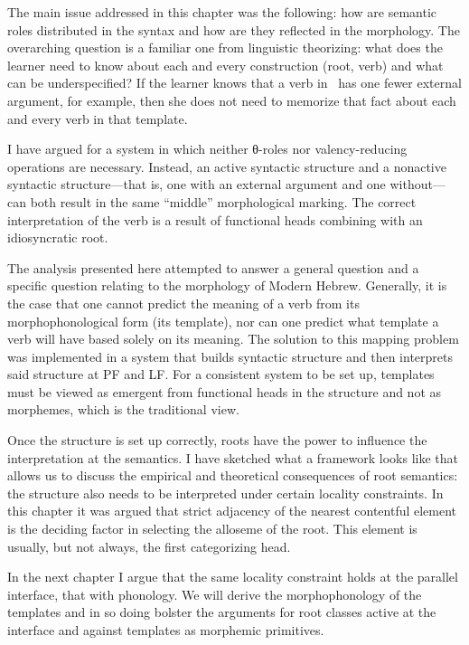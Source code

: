 The main issue addressed in this chapter was the following: how are semantic roles distributed in the syntax and how are they reflected in the morphology. The overarching question is a familiar one from linguistic theorizing: what does the learner need to know about each and every construction (root, verb) and what can be underspecified? If the learner knows that a verb in \tnif~has one fewer external argument, for example, then she does not need to memorize that fact about each and every verb in that template.  

I have argued for a system in which neither θ-roles nor valency-reducing operations are necessary. Instead, an active syntactic structure and a nonactive syntactic structure---that is, one with an external argument and one without---can both result in the same ``middle'' morphological marking. The correct interpretation of the verb is a result of functional heads combining with an idiosyncratic root.

The analysis presented here attempted to answer a general question and a specific question relating to the morphology of Modern Hebrew. Generally, it is the case that one cannot predict the meaning of a verb from its morphophonological form (its template), nor can one predict what template a verb will have based solely on its meaning. The solution to this mapping problem was implemented in a system that builds syntactic structure and then interprets said structure at PF and LF. For a consistent system to be set up, templates must be viewed as emergent from functional heads in the structure and not as morphemes, which is the traditional view.

Once the structure is set up correctly, roots have the power to influence the interpretation at the semantics. I have sketched what a framework looks like that allows us to discuss the empirical and theoretical consequences of root semantics: the structure also needs to be interpreted under certain locality constraints. In this chapter it was argued that strict adjacency of the nearest contentful element is the deciding factor in selecting the alloseme of the root. This element is usually, but not always, the first categorizing head.

In the next chapter I argue that the same locality constraint holds at the parallel interface, that with phonology. We will derive the morphophonology of the templates and in so doing bolster the arguments for root classes active at the interface and against templates as morphemic primitives.